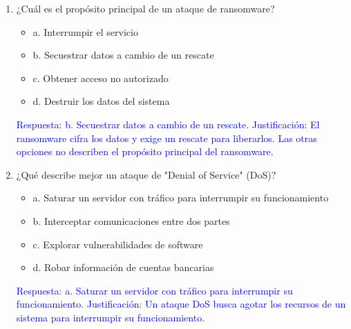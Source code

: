 \documentclass[a4paper]{article}
\begin{document}
\begin{enumerate}
    \item ¿Cuál es el propósito principal de un ataque de ransomware?
    \begin{itemize}
        \item a. Interrumpir el servicio
        \item b. Secuestrar datos a cambio de un rescate
        \item c. Obtener acceso no autorizado
        \item d. Destruir los datos del sistema
    \end{itemize}
    \textcolor{blue}{Respuesta: b. Secuestrar datos a cambio de un rescate. Justificación: El ransomware cifra los datos y exige un rescate para liberarlos. Las otras opciones no describen el propósito principal del ransomware.}
    \vspace{1cm}

    \item ¿Qué describe mejor un ataque de "Denial of Service" (DoS)?
    \begin{itemize}
        \item a. Saturar un servidor con tráfico para interrumpir su funcionamiento
        \item b. Interceptar comunicaciones entre dos partes
        \item c. Explorar vulnerabilidades de software
        \item d. Robar información de cuentas bancarias
    \end{itemize}
    \textcolor{blue}{Respuesta: a. Saturar un servidor con tráfico para interrumpir su funcionamiento. Justificación: Un ataque DoS busca agotar los recursos de un sistema para interrumpir su funcionamiento.}
    \vspace{1cm}



\end{enumerate}
\end{document}
